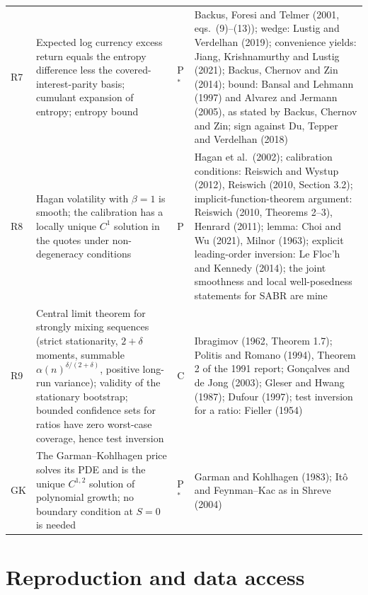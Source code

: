 \documentclass[11pt]{article}
\theoremstyle{result}
\begin{document}
\begin{table}[H]
\begin{tabularx}{\linewidth}{@{}l>{\raggedright\arraybackslash\hsize=1.25\hsize}X>{\raggedright\arraybackslash}p{1.9cm}>{\raggedright\arraybackslash\hsize=0.75\hsize}X@{}}
R7 & Expected log currency excess return equals the entropy difference less the covered-interest-parity basis; cumulant expansion of entropy; entropy bound & P$^*$ & Backus, Foresi and Telmer (2001, eqs.~(9)--(13)); wedge: Lustig and Verdelhan (2019); convenience yields: Jiang, Krishnamurthy and Lustig (2021); Backus, Chernov and Zin (2014); bound: Bansal and Lehmann (1997) and Alvarez and Jermann (2005), as stated by Backus, Chernov and Zin; sign against Du, Tepper and Verdelhan (2018) \\
R8 & Hagan volatility with $\beta=1$ is smooth; the calibration has a locally unique $C^1$ solution in the quotes under non-degeneracy conditions & P & Hagan et al.\ (2002); calibration conditions: Reiswich and Wystup (2012), Reiswich (2010, Section 3.2); implicit-function-theorem argument: Reiswich (2010, Theorems 2--3), Henrard (2011); lemma: Choi and Wu (2021), Milnor (1963); explicit leading-order inversion: Le Floc'h and Kennedy (2014); the joint smoothness and local well-posedness statements for SABR are mine \\
R9 & Central limit theorem for strongly mixing sequences (strict stationarity, $2+\delta$ moments, summable $\alpha(n)^{\delta/(2+\delta)}$, positive long-run variance); validity of the stationary bootstrap; bounded confidence sets for ratios have zero worst-case coverage, hence test inversion & C & Ibragimov (1962, Theorem 1.7); Politis and Romano (1994), Theorem 2 of the 1991 report; Gon\c{c}alves and de Jong (2003); Gleser and Hwang (1987); Dufour (1997); test inversion for a ratio: Fieller (1954) \\
GK & The Garman--Kohlhagen price solves its PDE and is the unique $C^{1,2}$ solution of polynomial growth; no boundary condition at $S=0$ is needed & P$^*$ & Garman and Kohlhagen (1983); It\^o and Feynman--Kac as in Shreve (2004) \\
\bottomrule
\end{tabularx}
\end{table}

\section{Reproduction and data access}\label{app:repro}
\end{document}
